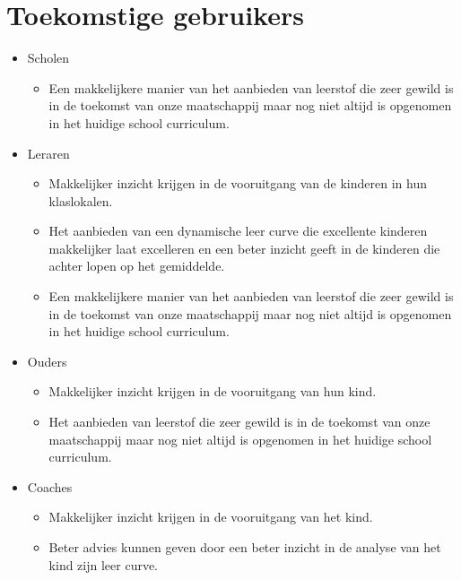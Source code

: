 \documentclass[]{report}
\begin{document}
\section{Toekomstige gebruikers}
\begin{itemize}
	
	\item Scholen 
	\begin{itemize}
		\item Een makkelijkere manier van het aanbieden van leerstof die zeer gewild is in de toekomst van onze maatschappij maar nog niet altijd is opgenomen in het huidige school curriculum.
		\newline
	\end{itemize} 
	 
	
	\item Leraren 
	\begin{itemize}
		\item Makkelijker inzicht krijgen in de vooruitgang van de kinderen in hun klaslokalen. 
		\item Het aanbieden van een dynamische leer curve die excellente kinderen makkelijker laat excelleren en een beter inzicht geeft in de kinderen die achter lopen op het gemiddelde.
		\item Een makkelijkere manier van het aanbieden van leerstof die zeer gewild is in de toekomst van onze maatschappij maar nog niet altijd is opgenomen in het huidige school curriculum.
			\newline
	\end{itemize} 
	
	\item Ouders
	\begin{itemize}
		\item Makkelijker inzicht krijgen in de vooruitgang van hun kind. 
		\item Het aanbieden van leerstof die zeer gewild is in de toekomst van onze maatschappij maar nog niet altijd is opgenomen in het huidige school curriculum.
			\newline
	\end{itemize} 

	\item Coaches
	\begin{itemize}
		\item Makkelijker inzicht krijgen in de vooruitgang van het kind. 
		\item Beter advies kunnen geven door een beter inzicht in de analyse van het kind zijn leer curve. 
			\newline
	\end{itemize} 
\end{itemize}
\end{document}
